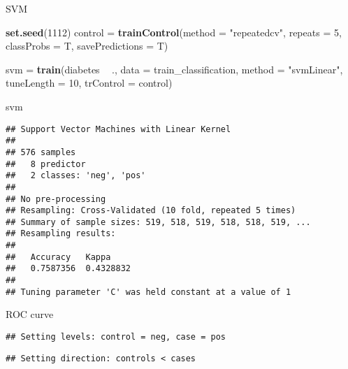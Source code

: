 \documentclass[]{article}
\newenvironment{Shaded}{\begin{snugshade}}{\end{snugshade}}
\newcommand{\DataTypeTok}[1]{\textcolor[rgb]{0.13,0.29,0.53}{#1}}
\newcommand{\DecValTok}[1]{\textcolor[rgb]{0.00,0.00,0.81}{#1}}
\newcommand{\KeywordTok}[1]{\textcolor[rgb]{0.13,0.29,0.53}{\textbf{#1}}}
\newcommand{\NormalTok}[1]{#1}
\newcommand{\OperatorTok}[1]{\textcolor[rgb]{0.81,0.36,0.00}{\textbf{#1}}}
\newcommand{\StringTok}[1]{\textcolor[rgb]{0.31,0.60,0.02}{#1}}
\begin{document}
SVM

\begin{Shaded}
\begin{Highlighting}[]
\KeywordTok{set.seed}\NormalTok{(}\DecValTok{1112}\NormalTok{)}
\NormalTok{control =}\StringTok{ }\KeywordTok{trainControl}\NormalTok{(}\DataTypeTok{method =} \StringTok{"repeatedcv"}\NormalTok{, }\DataTypeTok{repeats =} \DecValTok{5}\NormalTok{, }\DataTypeTok{classProbs =}\NormalTok{ T, }\DataTypeTok{savePredictions =}\NormalTok{ T)}

\NormalTok{svm =}\StringTok{ }\KeywordTok{train}\NormalTok{(diabetes }\OperatorTok{~}\StringTok{ }\NormalTok{.,  }\DataTypeTok{data =}\NormalTok{ train_classification, }\DataTypeTok{method =} \StringTok{"svmLinear"}\NormalTok{, }\DataTypeTok{tuneLength =} \DecValTok{10}\NormalTok{, }\DataTypeTok{trControl =}\NormalTok{ control)}

\NormalTok{svm}
\end{Highlighting}
\end{Shaded}

\begin{verbatim}
## Support Vector Machines with Linear Kernel 
## 
## 576 samples
##   8 predictor
##   2 classes: 'neg', 'pos' 
## 
## No pre-processing
## Resampling: Cross-Validated (10 fold, repeated 5 times) 
## Summary of sample sizes: 519, 518, 519, 518, 518, 519, ... 
## Resampling results:
## 
##   Accuracy   Kappa    
##   0.7587356  0.4328832
## 
## Tuning parameter 'C' was held constant at a value of 1
\end{verbatim}

ROC curve

\begin{Shaded}
\end{Shaded}

\begin{verbatim}
## Setting levels: control = neg, case = pos
\end{verbatim}

\begin{verbatim}
## Setting direction: controls < cases
\end{verbatim}
\end{document}
